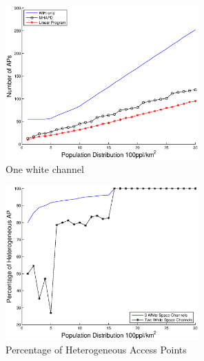 \begin{figure}
\centering
\includegraphics[width=74mm]{figures/onewhitechannel}
\vspace{-0.1in}
\caption{One white channel}                                                                 
\label{fig:onewhitechannel}
\vspace{-0.1in}
\end{figure}


\begin{figure}
\centering
\includegraphics[width=74mm]{figures/percentage}
\vspace{-0.1in}
\caption{Percentage of Heterogeneous Access Points}                                                                 
\label{fig:heappercentage}
\vspace{-0.1in}
\end{figure}


